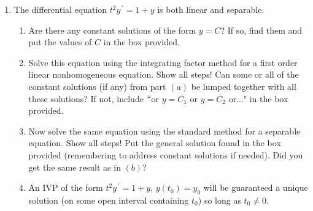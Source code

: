 \documentclass{ximera}
\begin{document}
\begin{enumerate}
\newpage

\item The differential equation $t^2y^{\,\prime}=1+y$ is both linear and separable.


\begin{enumerate}

\item  Are there any constant solutions of the form $y=C$?  If so, find them and put the values of $C$ in the box provided.

\vfill

\hfill{}



\item  Solve this equation using the integrating factor method for a first order linear nonhomogeneous equation.  Show all steps!  Can some or all of the constant solutions (if any) from part $(a)$ be lumped together with all these solutions?  If not, include $``$or $y=C_{1}$ or $y=C_{2}$ or..." in the box provided.


\vfill
\vfill

\hfill{}

\newpage



\item  Now solve the same equation using the standard method for a separable equation.  Show all steps!  Put the general solution found in the box provided (remembering to address constant solutions if needed).  Did you get the same result as in $(b)$?

\vfill

\hfill{}


\item  An IVP of the form $t^2y^{\,\prime}=1+y$, $y(t_{0})=y_{0}$ will be guaranteed a unique solution (on some open interval containing $t_{0}$) so long as $t_{0}\neq 0$.


\end{enumerate}
\end{enumerate}
\end{document}
